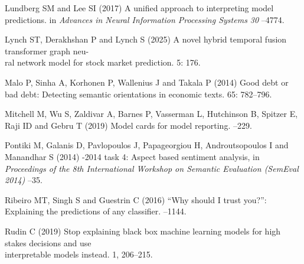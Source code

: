 \documentclass{aims}
\numberwithin{equation}{section}
\begin{document}
\begin{thebibliography}{}
\newblock Lundberg SM and Lee SI (2017)
\newblock A unified approach to interpreting model predictions.
\newblock in {\em Advances in Neural Information Processing Systems 30}
--4774.  

\newblock Lynch ST, Derakhshan P and Lynch S (2025)
\newblock A novel hybrid temporal fusion transformer graph neu-\\
ral network model for stock market prediction.
 5: 176.
\newblock {}

\newblock Malo P, Sinha A, Korhonen P, Wallenius J and Takala P (2014)
\newblock Good debt or bad debt: Detecting semantic orientations in economic
  texts.
 65: 782--796. 

\newblock Mitchell M, Wu S, Zaldivar A, Barnes P, Vasserman L,
  Hutchinson B, Spitzer E, Raji ID and Gebru T (2019)
\newblock Model cards for model reporting.
--229. 

\newblock Pontiki M,  Galanis D, Pavlopoulos J, Papageorgiou H,
  Androutsopoulos I and Manandhar S (2014)
-2014 task 4: Aspect based sentiment analysis,
\newblock in {\em Proceedings of the 8th International Workshop on Semantic
  Evaluation (SemEval 2014)} 
--35. 

\newblock Ribeiro MT, Singh S and Guestrin C (2016)
\newblock ``Why should {I} trust you?'': Explaining the predictions of any
  classifier.
--1144. 

\newblock Rudin C (2019)
\newblock Stop explaining black box machine learning models for high stakes decisions and use\\
interpretable models instead.
 1, 206--215. 


\end{thebibliography}
\end{document}
